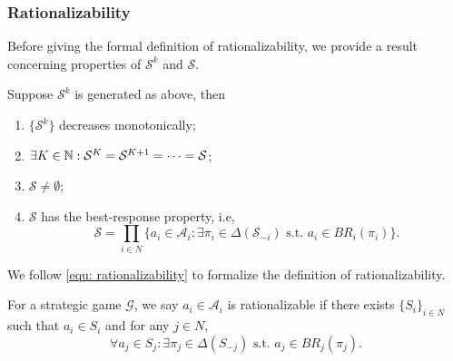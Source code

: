 \subsubsection{Rationalizability}
Before giving the formal definition of rationalizability, we provide a result concerning properties of $\mathcal{S}^k$ and $\mathcal{S}$.

\begin{proposition}
    Suppose $\mathcal{S}^k$ is generated as above, then 
    \begin{enumerate}
        \item $\{\mathcal{S}^k\}$ decreases monotonically;
        \item $\exists K\in \mathbb{N} : \mathcal{S}^K=\mathcal{S}^{K+1} =\cdots = \mathcal{S}$;
        \item $\mathcal{S}\neq \emptyset$;
        \item $\mathcal{S}$ has the best-response property, i.e, 
        \begin{equation} \label{equ: rationalizability}
            \mathcal{S}=\prod_{i\in N} \{a_i\in \mathcal{A}_i: \exists \pi_i \in \Delta(\mathcal{S}_{-i}) \text{ s.t. } a_i\in BR_i(\pi_i)\}.
        \end{equation}
    \end{enumerate}
\end{proposition}

We follow \eqref{equ: rationalizability} to formalize the definition of rationalizability.
\begin{definition}[Rationalizability]
    For a strategic game $\mathcal{G}$, we say $a_i\in\mathcal{A}_i$ is rationalizable if there exists $\{S_i\}_{i\in N}$ such that $a_i\in S_i$ and for any $j\in N$, $$\forall a_j\in S_j: \exists \pi_j \in \Delta(S_{-j}) \text{ s.t. } a_j\in BR_j(\pi_j).$$
\end{definition}


